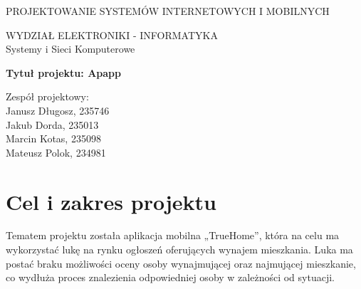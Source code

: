 \documentclass[polish, 11pt]{article}
\begin{document}
{
    \centering
    \Huge{PROJEKTOWANIE SYSTEMÓW INTERNETOWYCH I MOBILNYCH}
\vspace{2cm}

    \huge{WYDZIAŁ ELEKTRONIKI - INFORMATYKA \\ Systemy i Sieci Komputerowe}
\vspace{2cm}

    \LARGE{\textbf{Tytuł projektu: Apapp}}
\vspace{3cm}

    \begin{flushright}
        Zespół projektowy:\\
        Janusz Długosz, 235746\\
        Jakub Dorda, 235013\\
        Marcin Kotas, 235098\\
        Mateusz Polok, 234981
        
    \end{flushright}
}
\newpage
\tableofcontents
\newpage

\section{Cel i zakres projektu}
    Tematem projektu została aplikacja mobilna „TrueHome”, która na celu ma wykorzystać lukę na rynku ogłoszeń oferujących wynajem mieszkania. Luka ma postać braku możliwości oceny osoby wynajmującej oraz najmującej mieszkanie, co wydłuża proces znalezienia odpowiedniej osoby w zależności od sytuacji.
    
\end{document}

